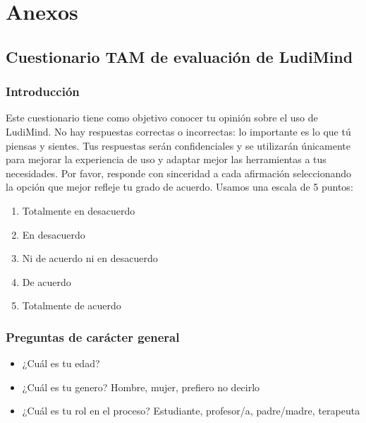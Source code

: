 \section{Anexos}
\subsection{Cuestionario TAM de evaluación de LudiMind}
\subsubsection{Introducción}
Este cuestionario tiene como objetivo conocer tu opinión sobre el uso de LudiMind. No hay respuestas correctas o incorrectas: lo importante es lo que tú piensas y sientes.
Tus respuestas serán confidenciales y se utilizarán únicamente para mejorar la experiencia de uso y adaptar mejor las herramientas a tus necesidades. 
Por favor, responde con sinceridad a cada afirmación seleccionando la opción que mejor refleje tu grado de acuerdo. Usamos una escala de 5 puntos:

\begin{enumerate}
    \item Totalmente en desacuerdo
    \item En desacuerdo
    \item Ni de acuerdo ni en desacuerdo
    \item De acuerdo
    \item Totalmente de acuerdo
\end{enumerate}

\subsubsection{Preguntas de carácter general}

\begin{itemize}
    \item ¿Cuál es tu edad? 
    \item ¿Cuál es tu genero? 
    Hombre, mujer, prefiero no decirlo 
    \item ¿Cuál es tu rol en el proceso? 
    Estudiante, profesor/a, padre/madre, terapeuta
\end{itemize}

